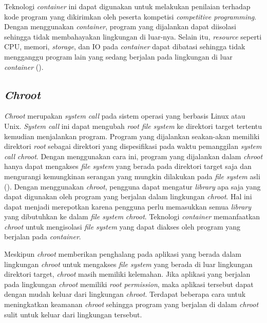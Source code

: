 \par Teknologi \textit{container} ini dapat digunakan untuk melakukan penilaian terhadap kode program yang dikirimkan oleh peserta kompetisi \textit{competitive programming}. Dengan menggunakan \textit{container}, program yang dijalankan dapat diisolasi sehingga tidak membahayakan lingkungan di luar-nya. Selain itu, \textit{resource} seperti CPU, memori, \textit{storage}, dan IO pada \textit{container} dapat dibatasi sehingga tidak mengganggu program lain yang sedang berjalan pada lingkungan di luar \textit{container} (\cite{merkeldocker}).

\subsection{\textit{Chroot}}

\par \textit{Chroot} merupakan \textit{system call} pada sistem operasi yang berbasis Linux atau Unix. \textit{System call} ini dapat mengubah \textit{root file system} ke direktori target tertentu kemudian menjalankan program. Program yang dijalankan seakan-akan memiliki direktori \textit{root} sebagai direktori yang dispesifikasi pada waktu pemanggilan \textit{system call} \textit{chroot}. Dengan menggunakan cara ini, program yang dijalankan dalam \textit{chroot} hanya dapat mengakses \textit{file system} yang berada pada direktori target saja dan mengurangi kemungkinan serangan yang mungkin dilakukan pada \textit{file system} asli (\cite{lessardchroot}). Dengan menggunakan \textit{chroot}, pengguna dapat mengatur \textit{library} apa saja yang dapat digunakan oleh program yang berjalan dalam lingkungan \textit{chroot}. Hal ini dapat menjadi merepotkan karena pengguna perlu memasukkan semua \textit{library} yang dibutuhkan ke dalam \textit{file system} \textit{chroot}. Teknologi \textit{container} memanfaatkan \textit{chroot} untuk mengisolasi \textit{file system} yang dapat diakses oleh program yang berjalan pada \textit{container}.

\par Meskipun \textit{chroot} memberikan penghalang pada aplikasi yang berada dalam lingkungan \textit{chroot} untuk mengakses \textit{file system} yang berada di luar lingkungan direktori target, \textit{chroot} masih memiliki kelemahan. Jika aplikasi yang berjalan pada lingkungan \textit{chroot} memiliki \textit{root permission}, maka aplikasi tersebut dapat dengan mudah keluar dari lingkungan \textit{chroot}. Terdapat beberapa cara untuk meningkatkan keamanan \textit{chroot} sehingga program yang berjalan di dalam \textit{chroot} sulit  untuk keluar dari lingkungan tersebut.

